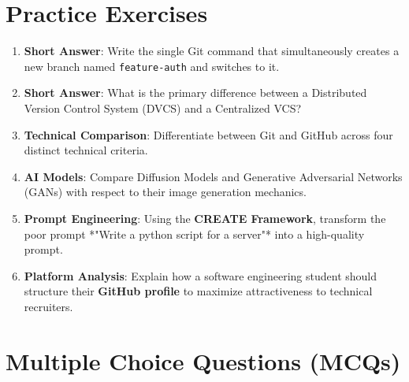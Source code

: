 \section{Practice Exercises}

\begin{practiceset}
\begin{enumerate}[leftmargin=1.5em]
    \item \textbf{Short Answer}: Write the single Git command that simultaneously creates a new branch named \texttt{feature-auth} and switches to it.
    \item \textbf{Short Answer}: What is the primary difference between a Distributed Version Control System (DVCS) and a Centralized VCS?
    \item \textbf{Technical Comparison}: Differentiate between Git and GitHub across four distinct technical criteria.
    \item \textbf{AI Models}: Compare Diffusion Models and Generative Adversarial Networks (GANs) with respect to their image generation mechanics.
    \item \textbf{Prompt Engineering}: Using the \textbf{CREATE Framework}, transform the poor prompt *"Write a python script for a server"* into a high-quality prompt.
    \item \textbf{Platform Analysis}: Explain how a software engineering student should structure their \textbf{GitHub profile} to maximize attractiveness to technical recruiters.
\end{enumerate}
\end{practiceset}

\section{Multiple Choice Questions (MCQs)}

